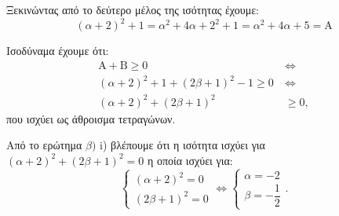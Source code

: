 
\begin{alist}
\item Ξεκινώντας από το δεύτερο μέλος της ισότητας έχουμε:
\[(\alpha + 2)^2 + 1 = \alpha^2 + 4\alpha + 2^2 + 1 = \alpha^2 + 4\alpha + 5 = \text{A}\]

\item 
\begin{rlist}
\item Ισοδύναμα έχουμε ότι:
\begin{align*}
\text{A} + \text{B} \ge 0 \ &\Leftrightarrow \\
(\alpha + 2)^2 + 1 + (2\beta + 1)^2 - 1 \ge 0 \ &\Leftrightarrow \\
(\alpha + 2)^2 + (2\beta + 1)^2 &\ge 0,
\end{align*}
που ισχύει ως άθροισμα τετραγώνων.
\item Από το ερώτημα $\beta)$ i) βλέπουμε ότι η ισότητα ισχύει για
$(\alpha + 2)^2 + (2\beta + 1)^2 = 0$
η οποία ισχύει για:
\[\begin{cases} (\alpha + 2)^2 = 0 \\ (2\beta + 1)^2 = 0 \end{cases} \Leftrightarrow \begin{cases} \alpha = -2 \\ \beta = -\dfrac{1}{2} \end{cases}.\]
\end{rlist}
\end{alist}

